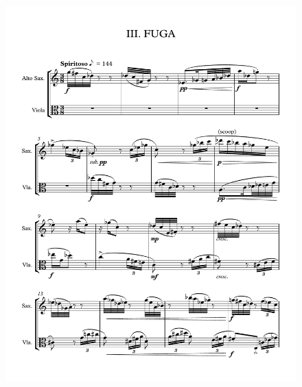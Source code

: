 \begin{figure}[htbp]
    \centering
	\includegraphics[width=6.5in]{figures/Sax_Viola_22.pdf}
\end{figure}

